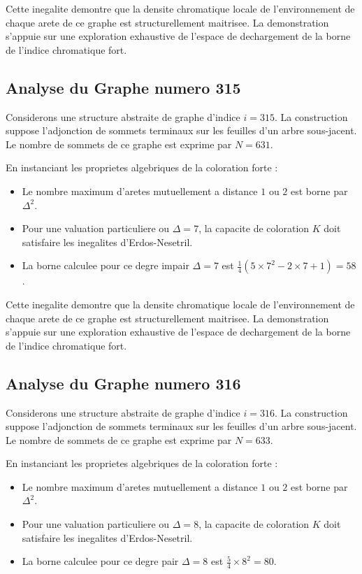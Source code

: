 \documentclass[11pt,a4paper]{article}
\begin{document}
Cette inegalite demontre que la densite chromatique locale de l'environnement de chaque arete de ce graphe est structurellement maitrisee. La demonstration s'appuie sur une exploration exhaustive de l'espace de dechargement de la borne de l'indice chromatique fort.

\subsection{Analyse du Graphe numero 315}
Considerons une structure abstraite de graphe d'indice $i = 315$. La construction suppose l'adjonction de sommets terminaux sur les feuilles d'un arbre sous-jacent. Le nombre de sommets de ce graphe est exprime par $N = 631$.

En instanciant les proprietes algebriques de la coloration forte :
\begin{itemize}
\item Le nombre maximum d'aretes mutuellement a distance $1$ ou $2$ est borne par $\Delta^2$.
\item Pour une valuation particuliere ou $\Delta = 7$, la capacite de coloration $K$ doit satisfaire les inegalites d'Erdos-Nesetril.
\item La borne calculee pour ce degre impair $\Delta = 7$ est $\frac{1}{4}(5 \times 7^2 - 2 \times 7 + 1) = 58$.
\end{itemize}

Cette inegalite demontre que la densite chromatique locale de l'environnement de chaque arete de ce graphe est structurellement maitrisee. La demonstration s'appuie sur une exploration exhaustive de l'espace de dechargement de la borne de l'indice chromatique fort.

\subsection{Analyse du Graphe numero 316}
Considerons une structure abstraite de graphe d'indice $i = 316$. La construction suppose l'adjonction de sommets terminaux sur les feuilles d'un arbre sous-jacent. Le nombre de sommets de ce graphe est exprime par $N = 633$.

En instanciant les proprietes algebriques de la coloration forte :
\begin{itemize}
\item Le nombre maximum d'aretes mutuellement a distance $1$ ou $2$ est borne par $\Delta^2$.
\item Pour une valuation particuliere ou $\Delta = 8$, la capacite de coloration $K$ doit satisfaire les inegalites d'Erdos-Nesetril.
\item La borne calculee pour ce degre pair $\Delta = 8$ est $\frac{5}{4} \times 8^2 = 80$.
\end{itemize}
\end{document}
